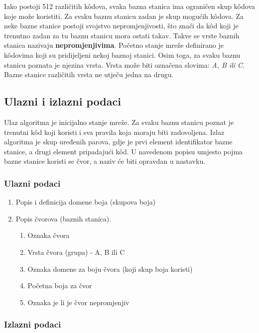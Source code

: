 \documentclass[times, utf8, diplomski, numeric]{fer}
\begin{document}
Iako postoji 512 različitih k\^{o}dova, svaka bazna stanica ima ograničen skup k\^{o}dova koje može koristiti. Za svaku baznu stanicu zadan je skup mogućih k\^{o}dova. Za neke bazne stanice postoji svojstvo nepromjenjivosti, što znači da k\^{o}d koji je trenutno zadan za tu baznu stanicu mora ostati takav. Takve se vrste baznih stanica nazivaju \textbf{nepromjenjivima}. Početno stanje mreže definirano je k\^{o}dovima koji su pridijeljeni nekoj baznoj stanici. Osim toga, za svaku baznu stanicu poznata je njezina vrsta. Vrsta može biti označena slovima: \emph{A, B ili C}. Bazne stanice različitih vrsta ne utječu jedna na drugu.

\subsection{Ulazni i izlazni podaci}

Ulaz algoritma je inicijalno stanje mreže. Za svaku baznu stanicu poznat je trenutni k\^{o}d koji koristi i sva pravila koja moraju biti zadovoljena. Izlaz algoritma je skup uređenih parova, gdje je prvi element identifikator bazne stanice, a drugi element pripadajući k\^{o}d. U navedenom popisu umjesto pojma bazne stanice koristi se čvor, a naziv će biti opravdan u nastavku.

\subsubsection{Ulazni podaci}

\begin{enumerate}
	\item Popis i definicija domene boja (skupova boja)
	\item Popis čvorova (baznih stanica).
		\begin{enumerate}
			\item Oznaka čvora
			\item Vrsta čvora (grupa) - A, B ili C
			\item Oznaka domene za boju čvora (koji skup boja koristi)
			\item Početna boja za čvor
			\item Oznaka je li je čvor nepromjenjiv
		\end{enumerate}
\end{enumerate} 

\subsubsection{Izlazni podaci}
\end{document}

